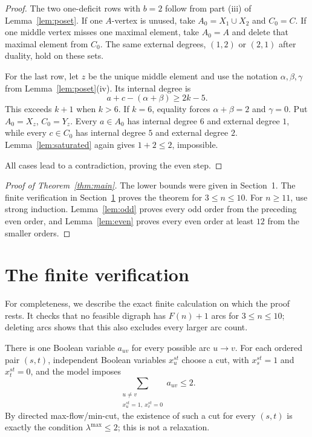 \documentclass[11pt]{amsart}
\theoremstyle{definition}
\newcommand{\lamax}{\lambda^{\max}}
\begin{document}
\begin{proof}
The two one-deficit rows with $b=2$ follow from part (iii) of
Lemma~\ref{lem:poset}.  If one $A$-vertex is unused, take
$A_0=X_1\cup X_2$ and $C_0=C$.  If one middle vertex misses one maximal
element, take $A_0=A$ and delete that maximal element from $C_0$.  The
same external degrees, $(1,2)$ or $(2,1)$ after duality, hold on these
sets.

For the last row, let $z$ be the unique middle element and use the notation
$\alpha,\beta,\gamma$ from Lemma~\ref{lem:poset}(iv).  Its internal degree
is
\[
 a+c-(\alpha+\beta)\ge2k-5.
\]
This exceeds $k+1$ when $k>6$.  If $k=6$, equality forces
$\alpha+\beta=2$ and $\gamma=0$.  Put $A_0=X_z$, $C_0=Y_z$.
Every $a\in A_0$ has internal degree $6$ and external degree $1$, while
every $c\in C_0$ has internal degree $5$ and external degree $2$.
Lemma~\ref{lem:saturated} again gives $1+2\le2$, impossible.

All cases lead to a contradiction, proving the even step.
\end{proof}

\begin{proof}[Proof of Theorem~\ref{thm:main}]
The lower bounds were given in Section~1.  The finite verification in
Section~\ref{sec:computer} proves the theorem for $3\le n\le10$.
For $n\ge11$, use strong induction.  Lemma~\ref{lem:odd} proves every odd
order from the preceding even order, and Lemma~\ref{lem:even} proves every
even order at least $12$ from the smaller orders.
\end{proof}

\section{The finite verification}\label{sec:computer}

For completeness, we describe the exact finite calculation on which the
proof rests.  It checks that no feasible digraph has $F(n)+1$ arcs for
$3\le n\le10$; deleting arcs shows that this also excludes every larger
arc count.

There is one Boolean variable $a_{uv}$ for every possible arc $u\to v$.
For each ordered pair $(s,t)$, independent Boolean variables
$x_u^{st}$ choose a cut, with $x_s^{st}=1$ and $x_t^{st}=0$, and the model
imposes
\begin{equation}\label{eq:cut-encoding}
 \sum_{\substack{u\ne v\\x_u^{st}=1,\ x_v^{st}=0}} a_{uv}\le2.
\end{equation}
By directed max-flow/min-cut, the existence of such a cut for every
$(s,t)$ is exactly the condition $\lamax\le2$; this is not a relaxation.
\end{document}
